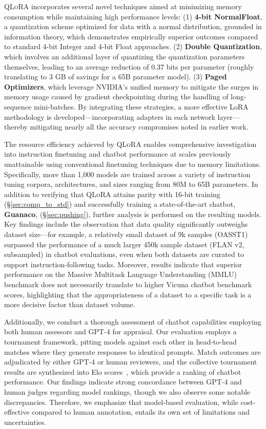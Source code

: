 \textsc{QLoRA} incorporates several novel techniques aimed at minimizing memory consumption while maintaining high performance levels: (1) \textbf{4-bit NormalFloat}, a quantization scheme optimized for data with a normal distribution, grounded in information theory, which demonstrates empirically superior outcomes compared to standard 4-bit Integer and 4-bit Float approaches. (2) \textbf{Double Quantization}, which involves an additional layer of quantizing the quantization parameters themselves, leading to an average reduction of 0.37 bits per parameter (roughly translating to 3 GB of savings for a 65B parameter model). (3) \textbf{Paged Optimizers}, which leverage NVIDIA’s unified memory to mitigate the surges in memory usage caused by gradient checkpointing during the handling of long-sequence mini-batches. By integrating these strategies, a more effective LoRA methodology is developed—incorporating adapters in each network layer—thereby mitigating nearly all the accuracy compromises noted in earlier work.

The resource efficiency achieved by \textsc{QLoRA} enables comprehensive investigation into instruction finetuning and chatbot performance at scales previously unattainable using conventional finetuning techniques due to memory limitations. Specifically, more than 1,000 models are trained across a variety of instruction tuning corpora, architectures, and sizes ranging from 80M to 65B parameters. In addition to verifying that \textsc{QLoRA} attains parity with 16-bit training (\S\ref{sec:comp_to_std}) and successfully training a state-of-the-art chatbot, \textbf{Guanaco}, (\S\ref{sec:pushing}), further analysis is performed on the resulting models. Key findings include the observation that data quality significantly outweighs dataset size—for example, a relatively small dataset of 9k samples (OASST1) surpassed the performance of a much larger 450k sample dataset (FLAN v2, subsampled) in chatbot evaluations, even when both datasets are curated to support instruction-following tasks. Moreover, results indicate that superior performance on the Massive Multitask Language Understanding (MMLU) benchmark does not necessarily translate to higher Vicuna chatbot benchmark scores, highlighting that the appropriateness of a dataset to a specific task is a more decisive factor than dataset volume.

Additionally, we conduct a thorough assessment of chatbot capabilities employing both human assessors and GPT-4 for appraisal. Our evaluation employs a tournament framework, pitting models against each other in head-to-head matches where they generate responses to identical prompts. Match outcomes are adjudicated by either GPT-4 or human reviewers, and the collective tournament results are synthesized into Elo scores~\citep{elo1967proposed, elo1978rating}, which provide a ranking of chatbot performance. Our findings indicate strong concordance between GPT-4 and human judges regarding model rankings, though we also observe some notable discrepancies. Therefore, we emphasize that model-based evaluation, while cost-effective compared to human annotation, entails its own set of limitations and uncertainties.


